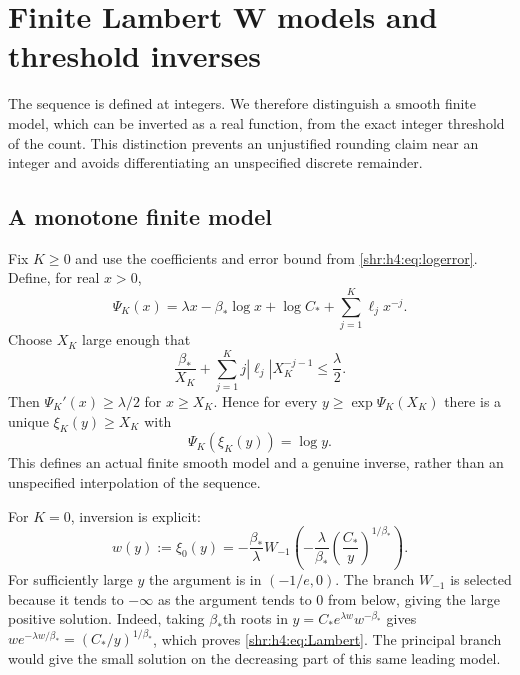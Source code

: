 \documentclass[11pt,letterpaper]{article}
\numberwithin{equation}{section}
\theoremstyle{definition}
\newcommand{\1}{\mathbf 1}
\begin{document}
\section{Finite Lambert W models and threshold inverses}
\label{shr:h4:sec:inverse}
The sequence is defined at integers. We therefore distinguish a smooth
finite model, which can be inverted as a real function, from the exact
integer threshold of the count. This distinction prevents an unjustified
rounding claim near an integer and avoids differentiating an unspecified
discrete remainder.

\subsection{A monotone finite model}
Fix $K\ge0$ and use the coefficients and error bound from
\eqref{shr:h4:eq:logerror}. Define, for real $x>0$,
\begin{equation}
 \Psi_K(x)=\lambda x-\beta_*\log x+\log C_*
                  +\sum_{j=1}^K\ell_jx^{-j}.
 \label{shr:h4:eq:Psi}
\end{equation}
Choose $X_K$ large enough that
\begin{equation}
 \frac{\beta_*}{X_K}
 +\sum_{j=1}^Kj|\ell_j|X_K^{-j-1}\le\frac\lambda2.
 \label{shr:h4:eq:XK}
\end{equation}
Then $\Psi_K'(x)\ge\lambda/2$ for $x\ge X_K$. Hence for every
$y\ge\exp\Psi_K(X_K)$ there is a unique $\xi_K(y)\ge X_K$ with
\begin{equation}
 \Psi_K(\xi_K(y))=\log y.
 \label{shr:h4:eq:xi}
\end{equation}
This defines an actual finite smooth model and a genuine inverse, rather
than an unspecified interpolation of the sequence.

For $K=0$, inversion is explicit:
\begin{equation}
 w(y):=\xi_0(y)
 =-\frac{\beta_*}{\lambda}
 W_{-1}\left(-\frac{\lambda}{\beta_*}
                   \left(\frac{C_*}{y}\right)^{1/\beta_*}\right).
 \label{shr:h4:eq:Lambert}
\end{equation}
For sufficiently large $y$ the argument is in $(-1/e,0)$. The branch
$W_{-1}$ is selected because it tends to $-\infty$ as the argument tends
to $0$ from below, giving the large positive solution. Indeed, taking
$\beta_*$th roots in $y=C_*e^{\lambda w}w^{-\beta_*}$ gives
$w e^{-\lambda w/\beta_*}=(C_*/y)^{1/\beta_*}$, which proves
\eqref{shr:h4:eq:Lambert}. The principal branch would give the small solution
on the decreasing part of this same leading model.
\end{document}
